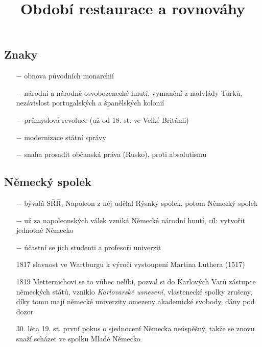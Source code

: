 \documentclass{article}
\title{\vspace{-2cm}Období restaurace a rovnováhy\vspace{-1.7cm}}
\date{}
\author{}
\begin{document}
\maketitle

\subsection*{Znaky}
\begin{itemize}
    \vspace{-0.5em}
    \setlength\itemsep{0.15em}
    \item[$-$] obnova původních monarchií
    \item[$-$] národní a národně osvobozenecké hnutí, vymanění z nadvlády Turků, nezávislost portugalských a španělských kolonií
    \item[$-$] průmyslová revoluce (už od 18. st. ve Velké Británii)
    \item[$-$] modernizace státní správy
    \item[$-$] snaha prosadit občanská práva (Rusko), proti absolutismu
\end{itemize}

\subsection*{Německý spolek}
\begin{itemize}
    \vspace{-0.5em}
    \setlength\itemsep{0.15em}
    \item[$-$] bývalá SŘŘ, Napoleon z něj udělal Rýsnký spolek, potom Německý spolek
    \item[$-$] už za napoleonských válek vzniká Německé národní hnutí, cíl: vytvořit jednotné Německo
    \item[$-$] účastní se jich studenti a profesoři univerzit
    \item[1817] slavnost ve Wartburgu k výročí vystoupení Martina Luthera (1517)
    \item[1819] Metternichovi se to vůbec nelíbí, pozval si do Karlových Varů zástupce německých států, vzniklo \textit{Karlovarské usnesení}, vlastenecké spolky zrušeny, díky tomu mají německé univerzity omezeny akademické svobody, dány pod dozor
    \item[30. léta 19. st.] první pokus o sjednocení Německa neúspěšný, takže se znovu snaží scházet ve spolku Mladé Německo
\end{itemize}
\end{document}
